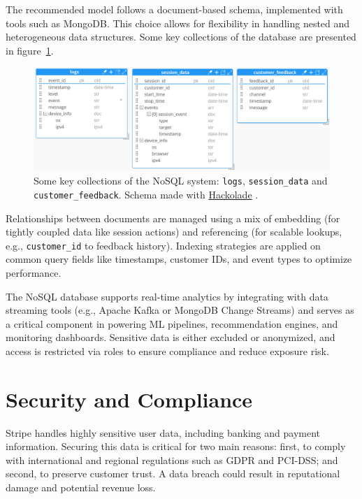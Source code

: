\documentclass[11pt,a4paper,computermodern]{article}
\newcommand{\code}{\texttt}
\begin{document}
The recommended model follows a document-based schema, implemented with tools such as MongoDB. This choice allows for flexibility in handling nested and heterogeneous data structures. Some key collections of the database are presented in figure~\ref{fig:NoSQL}.

\begin{figure}[!htb]
	\centering
	\includegraphics[scale=0.66]{./figures/NoSQL}
	\caption{Some key collections of the NoSQL system: \code{logs}, \code{session\_data} and \code{customer\_feedback}. Schema made with \href{https://hackolade.com/}{Hackolade} .}
	\label{fig:NoSQL}
\end{figure}


Relationships between documents are managed using a mix of embedding (for tightly coupled data like session actions) and referencing (for scalable lookups, e.g., \code{customer\_id} to feedback history). Indexing strategies are applied on common query fields like timestamps, customer IDs, and event types to optimize performance.

The NoSQL database supports real-time analytics by integrating with data streaming tools (e.g., Apache Kafka or MongoDB Change Streams) and serves as a critical component in powering ML pipelines, recommendation engines, and monitoring dashboards. Sensitive data is either excluded or anonymized, and access is restricted via roles to ensure compliance and reduce exposure risk.


\clearpage
\section*{Security and Compliance}

Stripe handles highly sensitive user data, including banking and payment information. Securing this data is critical for two main reasons: first, to comply with international and regional regulations such as GDPR and PCI-DSS; and second, to preserve customer trust. A data breach could result in reputational damage and potential revenue loss.
\end{document}
